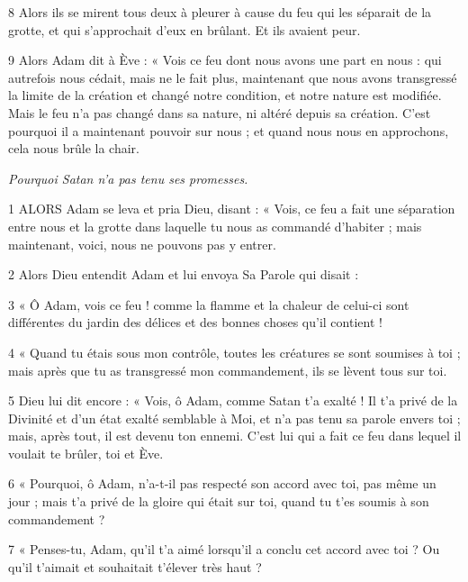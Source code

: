 \par 8 Alors ils se mirent tous deux à pleurer à cause du feu qui les séparait de la grotte, et qui s'approchait d'eux en brûlant. Et ils avaient peur.

\par 9 Alors Adam dit à Ève : « Vois ce feu dont nous avons une part en nous : qui autrefois nous cédait, mais ne le fait plus, maintenant que nous avons transgressé la limite de la création et changé notre condition, et notre nature est modifiée. Mais le feu n'a pas changé dans sa nature, ni altéré depuis sa création. C'est pourquoi il a maintenant pouvoir sur nous ; et quand nous nous en approchons, cela nous brûle la chair.


\par \textit{Pourquoi Satan n'a pas tenu ses promesses.}

\par 1 ALORS Adam se leva et pria Dieu, disant : « Vois, ce feu a fait une séparation entre nous et la grotte dans laquelle tu nous as commandé d'habiter ; mais maintenant, voici, nous ne pouvons pas y entrer.

\par 2 Alors Dieu entendit Adam et lui envoya Sa Parole qui disait :

\par 3 « Ô Adam, vois ce feu ! comme la flamme et la chaleur de celui-ci sont différentes du jardin des délices et des bonnes choses qu'il contient !

\par 4 « Quand tu étais sous mon contrôle, toutes les créatures se sont soumises à toi ; mais après que tu as transgressé mon commandement, ils se lèvent tous sur toi.

\par 5 Dieu lui dit encore : « Vois, ô Adam, comme Satan t'a exalté ! Il t'a privé de la Divinité et d'un état exalté semblable à Moi, et n'a pas tenu sa parole envers toi ; mais, après tout, il est devenu ton ennemi. C’est lui qui a fait ce feu dans lequel il voulait te brûler, toi et Ève.

\par 6 « Pourquoi, ô Adam, n'a-t-il pas respecté son accord avec toi, pas même un jour ; mais t'a privé de la gloire qui était sur toi, quand tu t'es soumis à son commandement ?

\par 7 « Penses-tu, Adam, qu'il t'a aimé lorsqu'il a conclu cet accord avec toi ? Ou qu'il t'aimait et souhaitait t'élever très haut ?


